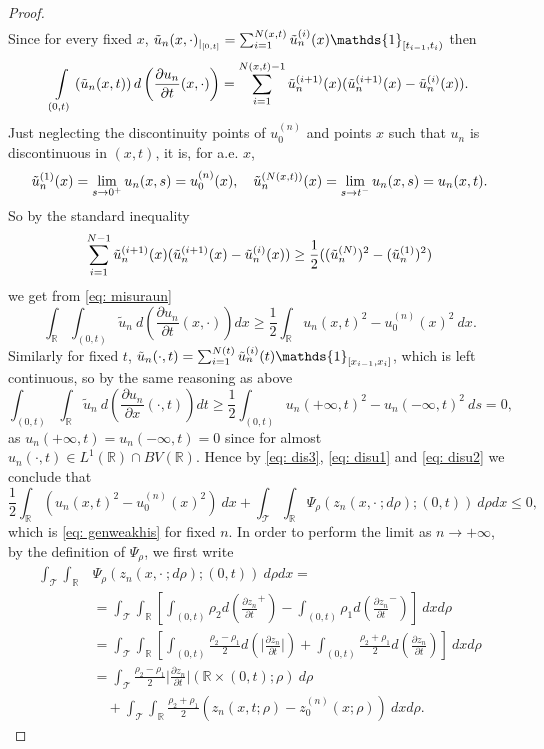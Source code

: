 \documentclass[12pt]{article}
\newcommand{\R}{\mathbb{R}}
\newcommand{\T}{\mathcal{T}}
\newcommand{\p}{\rho}
\newcommand{\1}{\mathds{1}}
\theoremstyle{definition}
\begin{document}
\begin{proof}
\begin{multline}
   \end{multline}
   Since for every fixed $x$, $\Tilde{u}_n(x,\cdot)_{|_{[0,t]}}=\sum_{i=1}^{N(x,t)} \Tilde{u}_n^{(i)}(x) \1 _{[t_{i-1},t_i)}$  then \begin{equation}\label{eq: misuraun}
   \int\limits_{(0,t)}\left(\Tilde{u}_n(x,t)\right)d \left(\frac{\partial u_n}{\partial t}(x,\cdot)\right) = \sum_{i=1}^{N(x,t)-1}\Tilde{u}_n^{(i+1)}(x) (\Tilde{u}_n^{(i+1)}(x)-\Tilde{u}_n^{(i)}(x)). \end{equation} Just neglecting the discontinuity points of $u_0^{(n)}$ and points $x$ such that $u_n$ is discontinuous in $(x,t)$, it is, for a.e. $x$, \[\Tilde{u}_n^{(1)}(x)=\lim_{s\to 0^+} u_n(x,s)=u_0^{(n)}(x), \quad \Tilde{u}_n^{(N(x,t))}(x)=\lim_{s\to t^-} u_n(x,s)=u_n(x,t).\] So by the standard inequality \[ \sum_{i=1}^{N-1} \Tilde{u}_n^{(i+1)}(x) (\Tilde{u}_n^{(i+1)}(x)-\Tilde{u}_n^{(i)}(x)) \geq \frac{1}{2} ((\Tilde{u}_n^{(N)})^2-(\Tilde{u}_n^{(1)})^2)\] we get from \eqref{eq: misuraun} \begin{equation}\label{eq: disu1}
       \int_\R \int_{(0,t)} \tilde{u}_n ~d\left(\frac{\partial u_n}{\partial t} (x,\cdot)\right) dx  \geq \frac{1}{2}\int_\R u_n(x,t)^2 -u_0^{(n)}(x)^2~dx.
   \end{equation}
   Similarly for fixed $t$, $\Tilde{u}_n(\cdot,t)=\sum_{i=1}^{N(t)} \Tilde{u}_n^{(i)}(t) \1 _{[x_{i-1},x_i]}$, which is left continuous, so by the same reasoning as above \begin{equation}\label{eq: disu2}
        \int_{(0,t)} \int_\R\tilde{u}_n ~d\left(\frac{\partial u_n}{\partial x} (\cdot,t)\right) dt  \geq \frac{1}{2}\int_{(0,t)} u_n(+\infty,t)^2 -u_n(-\infty,t)^2~ds=0,
   \end{equation} as $u_n(+\infty,t)=u_n(-\infty,t)=0$ since for almost $u_n(\cdot,t)\in L^1(\R)\cap BV(\R)$. Hence by \eqref{eq: dis3}, \eqref{eq: disu1} and \eqref{eq: disu2} we conclude that \begin{equation}\label{eq: dis4}
        \frac{1}{2}\int_\R \left(u_n(x,t)^2 -u_0^{(n)}(x)^2\right)~dx + \int_{\T} \int_\R \Psi_\p(z_n(x,\cdot~;d\p);(0,t)) ~d\p dx \leq 0,     
   \end{equation} which is \eqref{eq: genweakhis} for fixed $n$. In order to perform the limit as $n\to+\infty$, by the definition of $\Psi_\p$, we first write  \begin{equation}\begin{split}\label{eq: hweak2}
    \int_{\T} \int_\R& \Psi_\p(z_n(x,\cdot~;d\p);(0,t)) ~d\p dx= \\&= \int_{\T} \int_\R \left[\int_{(0,t)} \p_2 d \left(\frac{\partial z_n}{\partial t}^+ \right) - \int_{(0,t)} \p_1 d \left(\frac{\partial z_n}{\partial t}^-\right) \right]~ dx d\p \\ &=  \int_{\T} \int_\R \left[\int_{(0,t)} \frac{\p_2-\p_1}{2} d \left(\bigg|\frac{\partial z_n}{\partial t}\bigg| \right) + \int_{(0,t)} \frac{\p_2+\p_1}{2} d \left(\frac{\partial z_n}{\partial t}\right)\right] ~dx d\p \\ & =\int_{\T} \frac{\p_2-\p_1}{2}  \bigg|\frac{\partial z_n}{\partial t}\bigg|(\R \times (0,t);\p)~ d\p \\ & \quad+ \int_{\T} \int_{\R} \frac{\p_2+\p_1}{2} (z_n(x,t;\p)-z_0^{(n)}(x;\p) )~ dx d\p.

\end{split}
\end{equation}
\end{proof}
\end{document}
